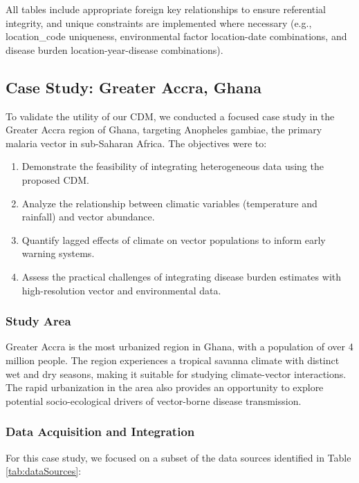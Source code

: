 \documentclass{article}
\begin{document}
All tables include appropriate foreign key relationships to ensure referential integrity, and unique constraints are implemented 
where necessary (e.g., location\_code uniqueness, environmental factor location-date combinations, and disease burden 
location-year-disease combinations).

\subsection{Case Study: Greater Accra, Ghana}

To validate the utility of our CDM, we conducted a focused case study in the Greater Accra region of Ghana, targeting Anopheles 
gambiae, the primary malaria vector in sub-Saharan Africa. The objectives were to:

\begin{enumerate}
    \item Demonstrate the feasibility of integrating heterogeneous data using the proposed CDM.
    \item Analyze the relationship between climatic variables (temperature and rainfall) and vector abundance.
    \item Quantify lagged effects of climate on vector populations to inform early warning systems.
    \item Assess the practical challenges of integrating disease burden estimates with high-resolution vector and environmental data.
\end{enumerate}

\subsubsection{Study Area}
Greater Accra is the most urbanized region in Ghana, with a population of over 4 million people. The region experiences a tropical 
savanna climate with distinct wet and dry seasons, making it suitable for studying climate-vector interactions. The rapid 
urbanization in the area also provides an opportunity to explore potential socio-ecological drivers of vector-borne disease transmission.

\subsubsection{Data Acquisition and Integration}

For this case study, we focused on a subset of the data sources identified in Table \ref{tab:dataSources}:
\end{document}
